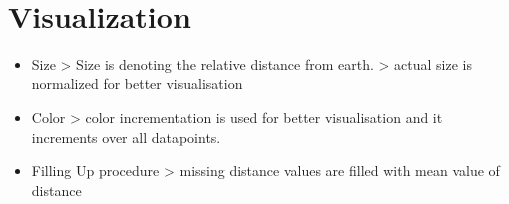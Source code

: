 \documentclass[11pt]{article}
\providecommand{\tightlist}{%
      \setlength{\itemsep}{0pt}\setlength{\parskip}{0pt}}
\begin{document}
    \begin{center}
    \end{center}
    { \hspace*{\fill} \\}
    
    \section{Visualization}\label{visualization}

\begin{itemize}
\tightlist
\item
  Size \textgreater{} Size is denoting the relative distance from earth.
  \textgreater{} actual size is normalized for better visualisation
\item
  Color \textgreater{} color incrementation is used for better
  visualisation and it increments over all datapoints.
\item
  Filling Up procedure \textgreater{} missing distance values are filled
  with mean value of distance
\end{itemize}
\end{document}
